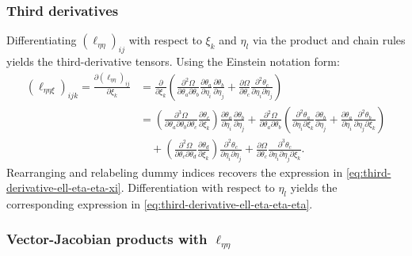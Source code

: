 \documentclass{article}
\begin{document}
\subsubsection{Third derivatives}

Differentiating $(\ell_{\eta\eta})_{ij}$ with respect to $\xi_k$ and $\eta_l$ via the product and chain rules yields the third-derivative tensors.
Using the Einstein notation form:
%
\begin{align}
  (\ell_{\eta\eta\xi})_{ijk} = \frac{\partial (\ell_{\eta\eta})_{ij}}{\partial \xi_k} & = \frac{\partial}{\partial \xi_k} \left( \frac{\partial^2 \Omega}{\partial \theta_a \partial \theta_b} \frac{\partial \theta_a}{\partial \eta_i} \frac{\partial \theta_b}{\partial \eta_j} + \frac{\partial \Omega}{\partial \theta_c} \frac{\partial^2 \theta_c}{\partial \eta_i \partial \eta_j} \right)                                                                                                                                                                                                               \\
                                                                                      & = \left( \frac{\partial^3 \Omega}{\partial \theta_a \partial \theta_b \partial \theta_c} \frac{\partial \theta_c}{\partial \xi_k} \right) \frac{\partial \theta_a}{\partial \eta_i} \frac{\partial \theta_b}{\partial \eta_j} + \frac{\partial^2 \Omega}{\partial \theta_a \partial \theta_b} \left( \frac{\partial^2 \theta_a}{\partial \eta_i \partial \xi_k} \frac{\partial \theta_b}{\partial \eta_j} + \frac{\partial \theta_a}{\partial \eta_i} \frac{\partial^2 \theta_b}{\partial \eta_j \partial \xi_k} \right) \\
                                                                                      & \quad + \left( \frac{\partial^2 \Omega}{\partial \theta_c \partial \theta_d} \frac{\partial \theta_d}{\partial \xi_k} \right) \frac{\partial^2 \theta_c}{\partial \eta_i \partial \eta_j} + \frac{\partial \Omega}{\partial \theta_c} \frac{\partial^3 \theta_c}{\partial \eta_i \partial \eta_j \partial \xi_k}.
\end{align}
%
Rearranging and relabeling dummy indices recovers the expression in \cref{eq:third-derivative-ell-eta-eta-xi}.
Differentiation with respect to $\eta_l$ yields the corresponding expression in \cref{eq:third-derivative-ell-eta-eta-eta}.

\subsubsection{Vector-Jacobian products with $\ell_{\eta\eta}$}
\end{document}
